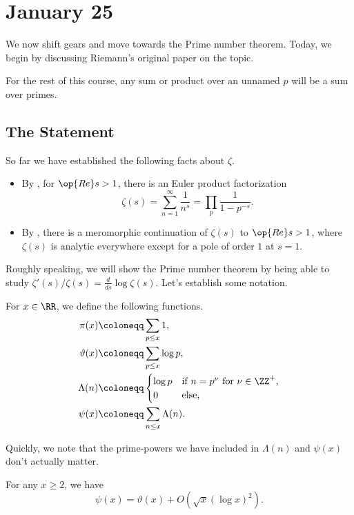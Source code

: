 \documentclass[../notes.tex]{subfiles}
\begin{document}
\section{January 25}

We now shift gears and move towards the Prime number theorem. Today, we begin by discussing Riemann's original paper on the topic.
\begin{remark}
	For the rest of this course, any sum or product over an unnamed $p$ will be a sum over primes.
\end{remark}

\subsection{The Statement}
So far we have established the following facts about $\zeta$.
\begin{itemize}
	\item By , for $\op{Re}s>1$, there is an Euler product factorization
	\[\zeta(s)=\sum_{n=1}^\infty\frac1{n^s}=\prod_p\frac1{1-p^{-s}}.\]
	\item By , there is a meromorphic continuation of $\zeta(s)$ to $\op{Re}s>1$, where $\zeta(s)$ is analytic everywhere except for a pole of order $1$ at $s=1$.
\end{itemize}
Roughly speaking, we will show the Prime number theorem by being able to study $\zeta'(s)/\zeta(s)=\frac d{ds}\log\zeta(s)$. Let's establish some notation.
\begin{definition}
	For $x\in\RR$, we define the following functions.
	\begin{align*}
		\pi(x) &\coloneqq \sum_{p\le x}1, \\
		\vartheta(x) &\coloneqq \sum_{p\le x}\log p, \\
		\Lambda(n) &\coloneqq\begin{cases}
			\log p & \text{if }n=p^\nu\text{ for }\nu\in\ZZ^+, \\
			0 & \text{else},
		\end{cases} \\
		\psi(x) &\coloneqq \sum_{n\le x}\Lambda(n).
	\end{align*}
\end{definition}
Quickly, we note that the prime-powers we have included in $\Lambda(n)$ and $\psi(x)$ don't actually matter.
\begin{lemma} \label{lem:no-prime-powers}
	For any $x\ge2$, we have
	\[\psi(x)=\vartheta(x)+O\left(\sqrt x(\log x)^2\right).\]
\end{lemma}
\end{document}
